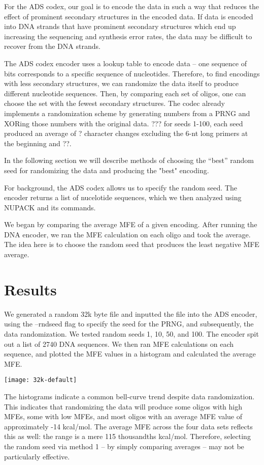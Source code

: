\documentclass{article}
\begin{document}
For the ADS codex, our goal is to encode the data in such a way that reduces the effect of prominent secondary structures in the encoded data. If data is encoded into DNA strands that have prominent secondary structures which end up increasing the sequencing and synthesis error rates, the data may be difficult to recover from the DNA strands. 

The ADS codex encoder uses a lookup table to encode data -- one sequence of bits corresponds to a specific sequence of nucleotides. Therefore, to find encodings with less secondary structures, we can randomize the data itself to produce different nucleotide sequences. Then, by comparing each set of oligos, one can choose the set with the fewest secondary structures. The codec already implements a randomization scheme by generating numbers from a PRNG and XORing those numbers with the original data. ??? for seeds 1-100, each seed produced an average of ? character changes excluding the 6-nt long primers at the beginning and ??. 

In the following section we will describe methods of choosing the “best” random seed for randomizing the data and producing the "best" encoding. 

For background, the ADS codex allows us to specify the random seed. The encoder returns a list of nucelotide sequences, which we then analyzed using NUPACK and its commands.

We began by comparing the average MFE of a given encoding. After running the DNA encoder, we ran the MFE calculation on each oligo and took the average. The idea here is to choose the random seed that produces the least negative MFE average.

\section{Results}
We generated a random 32k byte file and inputted the file into the ADS encoder, using the --rndseed flag to specify the seed for the PRNG, and subsequently, the data randomization. We tested random seeds 1, 10, 50, and 100. The encoder spit out a list of 2740 DNA sequences. We then ran MFE calculations on each sequence, and plotted the MFE values in a histogram and calculated the average MFE.

\texttt{[image: 32k-default]}

The histograms indicate a common bell-curve trend despite data randomization. This indicates that randomizing the data will produce some oligos with high MFEs, some with low MFEs, and most oligos with an average MFE value of approximately -14 kcal/mol. The average MFE across the four data sets reflects this as well: the range is a mere 115 thousandths kcal/mol. Therefore, selecting the random seed via method 1 -- by simply comparing averages -- may not be particularly effective.
\end{document}
